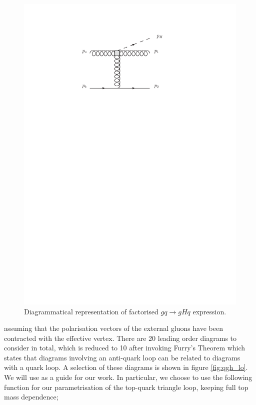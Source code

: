 \begin{figure}[t]
\centering
\includegraphics{Images/qgh_impact_factor.pdf}
\caption{Diagrammatical representation of factorised $gq \to gHq$ expression.}
\label{fig:gqH_imp}
\end{figure}

assuming that the polarisation vectors of the external gluons have been contracted with the effective vertex. There are 20 leading order diagrams to consider in total, which is reduced to 10 after invoking Furry's Theorem which states that diagrams involving an anti-quark loop can be related to diagrams with a quark loop. A selection of these diagrams is shown in figure \ref{fig:qgh_lo}. We will use \cite{DelDuca2001} as a guide for our work. In particular, we choose to use the following function for our parametrisation of the top-quark triangle loop, keeping full top mass dependence;

